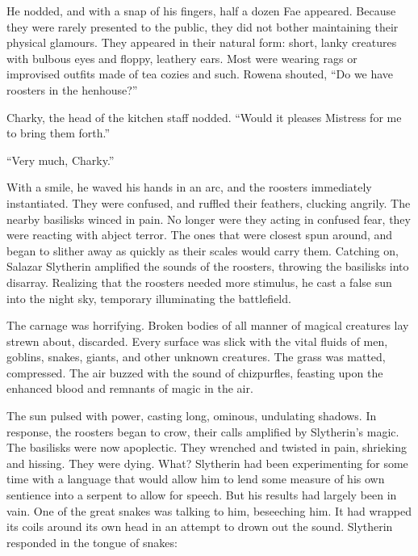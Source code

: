 He nodded, and with a snap of his fingers, half a dozen Fae appeared. Because they were rarely presented to the public, they did not bother maintaining their physical glamours. They appeared in their natural form: short, lanky creatures with bulbous eyes and floppy, leathery ears. Most were wearing rags or improvised outfits made of tea cozies and such. Rowena shouted, “Do we have roosters in the henhouse?”

Charky, the head of the kitchen staff nodded. “Would it pleases Mistress for me to bring them forth.”

“Very much, Charky.”

With a smile, he waved his hands in an arc, and the roosters immediately instantiated. They were confused, and ruffled their feathers, clucking angrily. The nearby basilisks winced in pain. No longer were they acting in confused fear, they were reacting with abject terror. The ones that were closest spun around, and began to slither away as quickly as their scales would carry them.
\SmallVSpace
Catching on, Salazar Slytherin amplified the sounds of the roosters, throwing the basilisks into disarray. Realizing that the roosters needed more stimulus, he cast a false sun into the night sky, temporary illuminating the battlefield.
\pagebreak

The carnage was horrifying. Broken bodies of all manner of magical creatures lay strewn about, discarded. Every surface was slick with the vital fluids of men, goblins, snakes, giants, and other unknown creatures. The grass was matted, compressed. The air buzzed with the sound of chizpurfles, feasting upon the enhanced blood and remnants of magic in the air.

The sun pulsed with power, casting long, ominous, undulating shadows. In response, the roosters began to crow, their calls amplified by Slytherin’s magic. The basilisks were now apoplectic. They wrenched and twisted in pain, shrieking and hissing. They were dying.
\SmallVSpace
{}
\SmallVSpace
What?
\SmallVSpace
Slytherin had been experimenting for some time with a language that would allow him to lend some measure of his own sentience into a serpent to allow for speech. But his results had largely been in vain.
\SmallVSpace
{}
\SmallVSpace
One of the great snakes was talking to him, beseeching him. It had wrapped its coils around its own head in an attempt to drown out the sound. Slytherin responded in the tongue of snakes:
\SmallVSpace
{}

